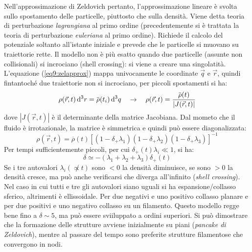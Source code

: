Nell'approssimazione di Zeldovich pertanto, l'approssimazione lineare è svolta sullo spostamento delle particelle, piuttosto che sulla densità. Viene detta teoria di perturbazione \textit{lagrangiana} al primo ordine (precedentemente si è trattata la teoria di perturbazione \textit{euleriana} al primo ordine). Richiede il calcolo del potenziale soltanto all'istante iniziale e prevede che le particelle si muovano su traiettorie rette. Il modello non è più esatto quando due particelle (assunte non collisionali) si incrociano (shell crossing): si viene a creare una singolatità. L'equazione (\ref{eq9:zelapprox}) mappa univocamente le coordinate $\vec{q}$ e $\vec{r}$, quindi fintantoché due traiettorie non si incrociano, per piccoli spostamenti si ha:
\begin{equation}
    \rho(\vec{r},t)\d{^3r}=\overbar{\rho} (t_i) \d{^3q} \quad \rightarrow \quad \rho(\vec{r},t) = \frac{\overbar{\rho} (t)}{|J(\vec{r},t)|}
\end{equation}
dove $|J(\vec{r},t)|$ è il determinante della matrice Jacobiana. Dal mometo che il fluido è irrotazionale, la matrice è simmetrica e quindi può essere diagonalizzata:
\begin{equation}
    \rho(\vec{r},t)=\overbar{\rho} (t) \left[\left(1-\delta_+ \lambda_1\right)\left(1-\delta_+ \lambda_2\right)\left(1-\delta_+ \lambda_3\right)\right]^{-1}
\end{equation}
Per tempi sufficientemente piccoli, per cui $\delta_+ (t)\lambda_i\ll 1$, si ha:
\begin{equation}
    \delta\simeq -\left(\lambda_1 + \lambda_2 + \lambda_3\right)\delta_+(t)
\end{equation}
Se i tre autovalori $\lambda_i (\not\propto t)$ sono $<0$ la densità diminuisce, se sono $>0$ la densità cresce, ma può anche verificarsi che diverga all'infinito (\textit{shell crossing}). Nel caso in cui tutti e tre gli autovalori siano uguali si ha espansione/collasso sferico, altrimenti è ellissoidale. Per due negativi e uno positivo collasso planare e per due positivi e uno negativo collasso su un filamento. Questo modello regge bene fino a $\delta\sim 5$, ma può essere sviiluppato a ordini superiori. 
Si può dimostrare che la formazione delle strutture avviene inizialmente su piani (\textit{pancake di Zeldovich}), mentre al passare del tempo sono preferite strutture filamentose che convergono in nodi. 

